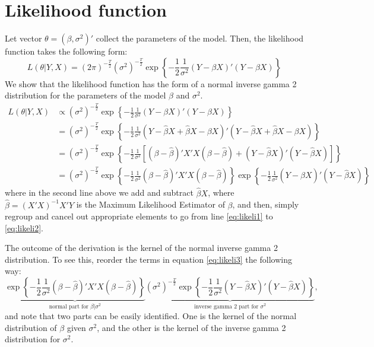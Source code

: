 \documentclass[
  letterpaper,
  DIV=11,
  numbers=noendperiod]{scrreprt}
\begin{document}
\hypertarget{likelihood-function}{%
\section{Likelihood function}\label{likelihood-function}}

Let vector \(\theta=\left(\beta,\sigma^2\right)'\) collect the
parameters of the model. Then, the likelihood function takes the
following form: \begin{equation}
L\left(\theta|Y,X\right) = (2\pi)^{-\frac{T}{2}} \left( \sigma^2 \right)^{-\frac{T}{2}}\exp\left\{ -\frac{1}{2}\frac{1}{\sigma^2}(Y-\beta X)'(Y-\beta X) \right\}
\end{equation} We show that the likelihood function has the form of a
normal inverse gamma 2 distribution for the parameters of the model
\(\beta\) and \(\sigma^2\). \begin{align}
L\left(\theta|Y,X\right) &\propto \left( \sigma^2 \right)^{-\frac{T}{2}}\exp\left\{ -\frac{1}{2}\frac{1}{\sigma^2}(Y-\beta X)'(Y-\beta X) \right\}\\[1ex]
&= \left( \sigma^2 \right)^{-\frac{T}{2}}\exp\left\{ -\frac{1}{2}\frac{1}{\sigma^2}(Y-\hat\beta X +\hat\beta X - \beta X)'(Y-\hat\beta X +\hat\beta X-\beta X) \right\}\label{eq:likeli1}\\[1ex]
&= \left( \sigma^2 \right)^{-\frac{T}{2}}\exp\left\{ -\frac{1}{2}\frac{1}{\sigma^2}\left[ (\beta - \hat\beta)'X'X (\beta - \hat\beta) + (Y-\hat\beta X)'(Y-\hat\beta X)\right] \right\}\label{eq:likeli2}\\[1ex]
&= \left( \sigma^2 \right)^{-\frac{T}{2}}\exp\left\{ -\frac{1}{2}\frac{1}{\sigma^2} (\beta - \hat\beta)'X'X (\beta - \hat\beta) \right\} \exp\left\{ -\frac{1}{2}\frac{1}{\sigma^2}  (Y-\hat\beta X)'(Y-\hat\beta X) \right\}\label{eq:likeli3}
\end{align} where in the second line above we add and subtract
\(\hat\beta X\), where \(\hat\beta = (X'X)^{-1}X'Y\) is the Maximum
Likelihood Estimator of \(\beta\), and then, simply regroup and cancel
out appropriate elements to go from line \eqref{eq:likeli1} to
\eqref{eq:likeli2}.

The outcome of the derivation is the kernel of the normal inverse gamma
2 distribution. To see this, reorder the terms in equation
\eqref{eq:likeli3} the following way: \begin{equation}
\underbrace{\exp\left\{ -\frac{1}{2}\frac{1}{\sigma^2} (\beta - \hat\beta)'X'X (\beta - \hat\beta) \right\}}_{\text{normal part for }\beta|\sigma^2}
\underbrace{\left( \sigma^2 \right)^{-\frac{T}{2}}\exp\left\{ -\frac{1}{2}\frac{1}{\sigma^2}  (Y-\hat\beta X)'(Y-\hat\beta X) \right\}}_{\text{inverse gamma 2 part for }\sigma^2},
\end{equation} and note that two parts can be easily identified. One is
the kernel of the normal distribution of \(\beta\) given \(\sigma^2\),
and the other is the kernel of the inverse gamma 2 distribution for
\(\sigma^2\).
\end{document}
